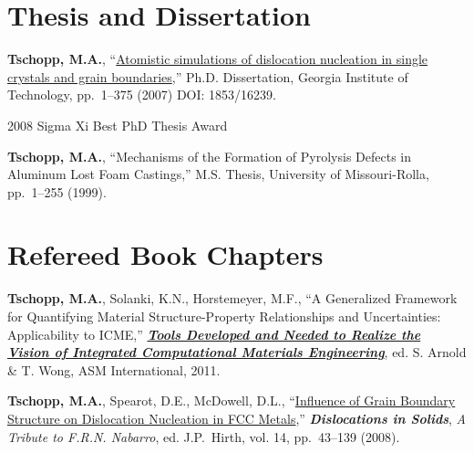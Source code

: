 \section{\sc Thesis and Dissertation}

\begin{cvlist}
\setlength{\itemsep}{0in}
\setlength{\parsep}{0in} 
\setlength{\parskip}{0in}
\setlength{\topsep}{0in} 
\setlength{\partopsep}{0in} 
\setlength{\leftmargin}{0.2in}

\item 
\textbf{Tschopp, M.A.}, ``\href{http://hdl.handle.net/1853/16239}{Atomistic simulations of dislocation nucleation in single crystals and grain boundaries},'' Ph.D. Dissertation, Georgia Institute of Technology, pp.\ 1--375 (2007) DOI: 1853/16239.
\begin{list2}
\item[$\star$] 2008 Sigma Xi Best PhD Thesis Award
\end{list2}

\item 
\textbf{Tschopp, M.A.}, ``Mechanisms of the Formation of Pyrolysis Defects in Aluminum Lost Foam Castings,'' M.S. Thesis, University of Missouri-Rolla, pp.\ 1--255 (1999).

\end{cvlist}

\section{\sc Refereed Book Chapters}

\begin{cvlist}
\setlength{\itemsep}{0in}
\setlength{\parsep}{0in} 
\setlength{\parskip}{0in}
\setlength{\topsep}{0in} 
\setlength{\partopsep}{0in} 
\setlength{\leftmargin}{0.2in}

\item
\textbf{Tschopp, M.A.}, Solanki, K.N., Horstemeyer, M.F., ``A Generalized Framework for Quantifying Material Structure-Property Relationships and Uncertainties: Applicability to ICME,'' \href{http://www.asminternational.org/portal/site/www/AsmStore/ProductDetails/?vgnextoid=98e8444762db0310VgnVCM100000621e010aRCRD#details}{\textbf{\textit{Tools Developed and Needed to Realize the Vision of Integrated Computational Materials Engineering}}}, ed. S. Arnold \& T. Wong, ASM International, 2011.

\item 
\textbf{Tschopp, M.A.}, Spearot, D.E., McDowell, D.L., ``\href{http://dx.doi.org/10.1016/S1572-4859(07)00002-2}{Influence of Grain Boundary Structure on Dislocation Nucleation in FCC Metals},'' \textbf{\textit{Dislocations in Solids}}, \textit{A Tribute to F.R.N. Nabarro}, ed. J.P.~Hirth, vol. 14, pp.~43--139 (2008).

\end{cvlist}

